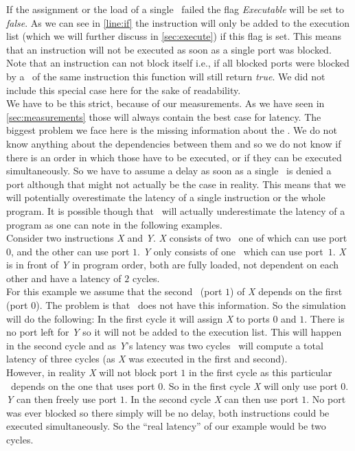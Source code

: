 If the assignment or the load of a single \microop\ failed the flag \emph{Executable} will be set to \emph{false}. As we can see in \autoref{line:if} the instruction will only be added to the execution list (which we will further discuss in \autoref{sec:execute}) if this flag is set. This means that an instruction will not be executed as soon as a single port was blocked. Note that an instruction can not block itself i.e., if all blocked ports were blocked by a \microop\ of the same instruction this function will still return \emph{true}. We did not include this special case here for the sake of readability.\\
We have to be this strict, because of our measurements. As we have seen in \autoref{sec:measurements} those will always contain the best case for latency. The biggest problem we face here is the missing information about the \microops. We do not know anything about the dependencies between them and so we do not know if there is an order in which those have to be executed, or if they can be executed simultaneously. So we have to assume a delay as soon as a single \microop\ is denied a port although that might not actually be the case in reality. This means that we will potentially overestimate the latency of a single instruction or the whole program. It is possible though that \suaca\ will actually underestimate the latency of a program as one can note in the following examples.\\


Consider two instructions \emph{X} and \emph{Y}. \emph{X} consists of two \microops\, one of which can use port $0$, and the other can use port $1$. \emph{Y} only consists of one \microop\ which can use port~$1$. \emph{X} is in front of \emph{Y} in program order, both are fully loaded, not dependent on each other and have a latency of $2$ cycles.\\
For this example we assume that the second \microop\ (port $1$) of \emph{X} depends on the first (port $0$). The problem is that \suaca\ does not have this information. So the simulation will do the following: In the first cycle it will assign \emph{X} to ports $0$ and $1$. There is no port left for \emph{Y} so it will not be added to the execution list. This will happen in the second cycle and as \emph{Y}'s latency was two cycles \suaca\ will compute a total latency of three cycles (as \emph{X} was executed in the first and second).\\
However, in reality \emph{X} will not block port $1$ in the first cycle as this particular \microop\ depends on the one that uses port $0$. So in the first cycle \emph{X} will only use port $0$. \emph{Y} can then freely use port $1$. In the second cycle \emph{X} can then use port $1$. No port was ever blocked so there simply will be no delay, both instructions could be executed simultaneously. So the ``real latency'' of our example would be two cycles.\\

